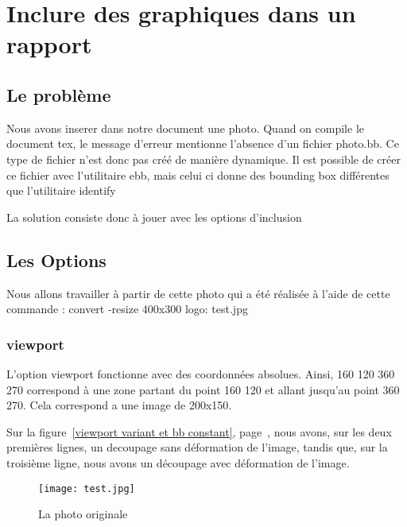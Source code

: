 
\section{Inclure des graphiques dans un rapport}
\subsection{Le problème}
Nous avons inserer dans notre document une photo.
Quand on compile le document tex, le message d'erreur mentionne l'absence d'un fichier photo.bb.
Ce type de fichier n'est donc pas créé de manière dynamique.
Il est possible de créer ce fichier avec l'utilitaire ebb, mais celui ci donne des bounding box
différentes que l'utilitaire identify

La solution consiste donc à jouer avec les options d'inclusion

\subsection{Les Options}

Nous allons travailler à partir de cette photo qui a été réalisée à l'aide de cette commande :
convert -resize 400x300 logo: test.jpg

\subsubsection{viewport}

L'option viewport fonctionne avec des coordonnées absolues.
Ainsi, {160 120 360 270} correspond à une zone partant du point {160 120}
et allant jusqu'au point {360 270}.
Cela correspond a une image de 200x150.

Sur la figure~\ref{viewport variant et bb constant}, page~\pageref{viewport variant et bb constant},
nous avons, sur les deux premières lignes, un decoupage sans déformation de l'image, 
tandis que, sur la troisième ligne, nous avons un découpage avec déformation de l'image.

\begin{figure}[!h]
  \centering
  \texttt{[image: test.jpg]}
  \caption{La photo originale}
  \label{Photo originale}
\end{figure}

